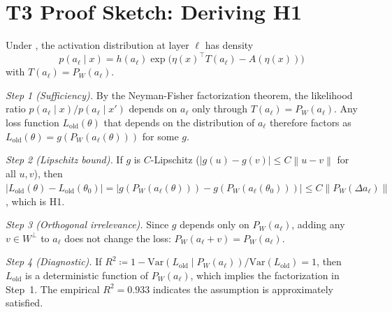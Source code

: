\documentclass[11pt,a4paper]{article}
\theoremstyle{definition}
\newcommand{\Var}{\mathrm{Var}}
\newcommand{\proj}[1]{P_{#1}}
\newcommand{\norm}[1]{\left\|#1\right\|}
\newcommand{\abs}[1]{\left|#1\right|}
\begin{document}
\section{T3 Proof Sketch: Deriving H1}
\label{app:t3}

Under , the activation distribution at layer $\ell$ has density
\[
p(a_\ell \mid x) = h(a_\ell) \exp\!\big(\eta(x)^\top T(a_\ell) - A(\eta(x))\big)
\]
with $T(a_\ell) = \proj{W}(a_\ell)$.

\textit{Step 1 (Sufficiency).} By the Neyman-Fisher factorization theorem, the likelihood ratio $p(a_\ell \mid x) / p(a_\ell \mid x')$ depends on $a_\ell$ only through $T(a_\ell) = \proj{W}(a_\ell)$. Any loss function $L_{\mathrm{old}}(\theta)$ that depends on the distribution of $a_\ell$ therefore factors as $L_{\mathrm{old}}(\theta) = g(\proj{W}(a_\ell(\theta)))$ for some $g$.

\textit{Step 2 (Lipschitz bound).} If $g$ is $C$-Lipschitz ($\abs{g(u) - g(v)} \leq C\norm{u-v}$ for all $u, v$), then $\abs{L_{\mathrm{old}}(\theta) - L_{\mathrm{old}}(\theta_0)} = \abs{g(\proj{W}(a_\ell(\theta))) - g(\proj{W}(a_\ell(\theta_0)))} \leq C \norm{\proj{W}(\Delta a_\ell)}$, which is H1.

\textit{Step 3 (Orthogonal irrelevance).} Since $g$ depends only on $\proj{W}(a_\ell)$, adding any $v \in W^\perp$ to $a_\ell$ does not change the loss: $\proj{W}(a_\ell + v) = \proj{W}(a_\ell)$.

\textit{Step 4 (Diagnostic).} If $R^2 \coloneqq 1 - \Var(L_{\mathrm{old}} \mid \proj{W}(a_\ell)) / \Var(L_{\mathrm{old}}) = 1$, then $L_{\mathrm{old}}$ is a deterministic function of $\proj{W}(a_\ell)$, which implies the factorization in Step~1. The empirical $R^2 = 0.933$ indicates the assumption is approximately satisfied.
\end{document}
